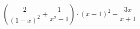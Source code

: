 \begin{ex}[type=expression]
	\begin{condition}
		\( \left( \dfrac{2}{(1-x)^2}+\dfrac{1}{x^2-1} \right)\cdot(x-1)^2-\dfrac{3x}{x+1} \)
	\end{condition}
\end{ex}